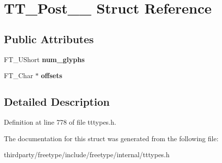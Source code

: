 \hypertarget{struct_t_t___post__25__}{}\section{T\+T\+\_\+\+Post\+\_\+\_\+ Struct Reference}
\label{struct_t_t___post__25__}
\subsection*{Public Attributes}
\begin{DoxyCompactItemize}
\item 
\mbox{\label{struct_t_t___post__25___aae397ce6206c910ecc13f8b46bace595}} 
F\+T\+\_\+\+U\+Short {\bfseries num\+\_\+glyphs}
\item 
\mbox{\label{struct_t_t___post__25___a499ec966b258c8454e9ea8f9455028b6}} 
F\+T\+\_\+\+Char $\ast$ {\bfseries offsets}
\end{DoxyCompactItemize}


\subsection{Detailed Description}


Definition at line 778 of file tttypes.\+h.



The documentation for this struct was generated from the following file\+:\begin{DoxyCompactItemize}
\item 
thirdparty/freetype/include/freetype/internal/tttypes.\+h\end{DoxyCompactItemize}

